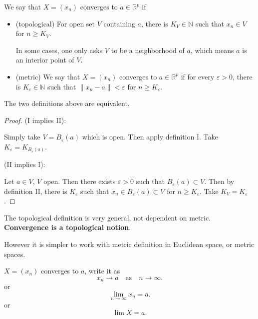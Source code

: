 
\begin{definition}
	We say that $X = (x_n)$ converges to $a \in \mathbb{R}^p$ if
	\begin{itemize}
	\item (topological)
		For open set $V$ containing $a$, there is $K_V \in \mathbb{N}$ such that $x_n \in V$ for $n \ge K_V$.

		In some cases, one only asks $V$ to be a neighborhood of $a$, which means $a$ is an interior point of $V$.
	\item (metric)
		We say that $X = (x_n)$ converges to $a \in \mathbb{R}^p$ if for every $\varepsilon>0$, there is $K_\varepsilon \in \mathbb{N}$ such that $\|x_n - a\|<\varepsilon$ for $n \ge K_\varepsilon$.
	\end{itemize}
\end{definition}

\begin{proposition}
	The two definitions above are equivalent.
\end{proposition}
\begin{proof}
	(I implies II): 

	Simply take $V = B_\varepsilon(a)$ which is open. Then apply definition I. Take $K_\varepsilon = K_{B_\varepsilon(a)}$.

	(II implies I):
	
	Let $a \in V$, $V$ open. Then there exists $\varepsilon>0$ such that $B_\varepsilon(a) \subset V$.
	Then by definition II, there is  $K_\varepsilon$ such that $x_n \in B_\varepsilon(a) \subset V$ for $n\ge K_\varepsilon$. Take $K_V = K_\varepsilon$.
\end{proof}
\begin{remark}
	The topological definition is very general, not dependent on metric. \textbf{Convergence is a topological notion}. 

	However it is simpler to work with metric definition in Euclidean space, or metric spaces.
\end{remark}

\begin{notation}
	$X = (x_n)$ converges to $a$, write it as \[
		x_n \to a \quad \text{as}\quad n\to \infty 
	.\] 
	or \[
		\lim_{n \to \infty} x_n = a
	.\] 
	or \[
		\lim X = a
	.\] 
\end{notation}

